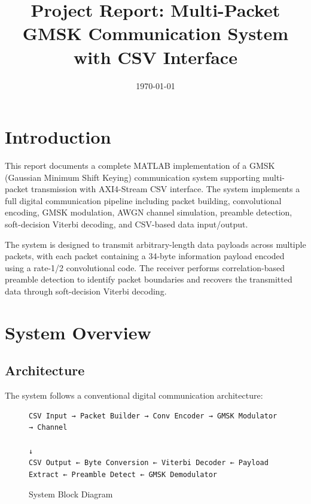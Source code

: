 \documentclass[12pt]{article}
\title{Project Report: Multi-Packet GMSK Communication System with CSV Interface}
\author{}
\date{\today}
\begin{document}
\maketitle

\section{Introduction}
This report documents a complete MATLAB implementation of a GMSK (Gaussian Minimum Shift Keying) communication system supporting multi-packet transmission with AXI4-Stream CSV interface. The system implements a full digital communication pipeline including packet building, convolutional encoding, GMSK modulation, AWGN channel simulation, preamble detection, soft-decision Viterbi decoding, and CSV-based data input/output.

The system is designed to transmit arbitrary-length data payloads across multiple packets, with each packet containing a 34-byte information payload encoded using a rate-1/2 convolutional code. The receiver performs correlation-based preamble detection to identify packet boundaries and recovers the transmitted data through soft-decision Viterbi decoding.

\section{System Overview}

\subsection{Architecture}
The system follows a conventional digital communication architecture:

\begin{figure}[h]
\centering
\begin{verbatim}
CSV Input → Packet Builder → Conv Encoder → GMSK Modulator → Channel
                                                                 ↓
CSV Output ← Byte Conversion ← Viterbi Decoder ← Payload Extract ← Preamble Detect ← GMSK Demodulator
\end{verbatim}
\caption{System Block Diagram}
\end{figure}
\end{document}
